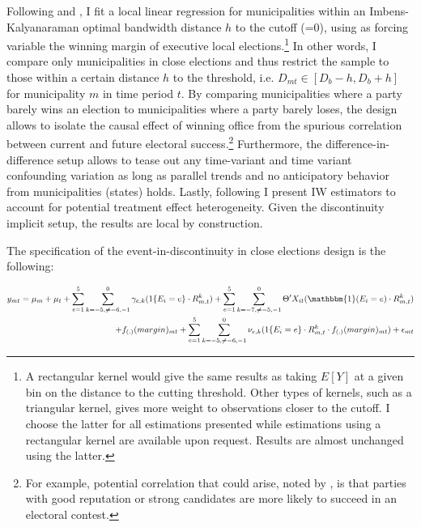 \documentclass[12pt]{amsart}
\numberwithin{equation}{section}
\theoremstyle{definition}
\theoremstyle{definition}
\theoremstyle{definition}
\begin{document}
Following \citet{grembi_2016} and \citet{gelman_imbens2014}, I fit a local linear regression for municipalities within an Imbens-Kalyanaraman optimal bandwidth distance $h$ to the cutoff (=0), using as forcing variable the winning margin of executive local elections.\footnote{A rectangular kernel would give the same results as taking $E[Y]$ at a given bin on the distance to the cutting threshold. Other types of kernels, such as a triangular kernel, gives more weight to observations closer to the cutoff. I choose the latter for all estimations presented while estimations using a rectangular kernel are available upon request. Results are almost unchanged using the latter.} In other words, I compare only municipalities in close elections and thus restrict the sample to those within a certain distance $h$ to the threshold, i.e. $D_{mt} \in [D_b-h, D_b+h]$ for municipality $m$ in time period $t$. By comparing municipalities where a party barely wins an election to municipalities where a party barely loses, the design allows to isolate the causal effect of winning office from the spurious correlation between current and future electoral success.\footnote{For example, potential correlation that could arise, noted by \citet{klasnja_titiunik_2017}, is that parties with good reputation or strong candidates are more likely to succeed in an electoral contest.} Furthermore, the difference-in-difference setup allows to tease out any time-variant and time variant confounding variation as long as parallel trends and no anticipatory behavior from municipalities (states) holds. Lastly, following \citet{abraham_sun_2020} I present IW estimators to account for potential treatment effect heterogeneity. Given the discontinuity implicit setup, the results are local by construction. 

The specification of the event-in-discontinuity in close elections design is the following:

\begin{equation}
\begin{split}
y_{mt}=\mu_m + \mu_t + \sum^5_{e=1} \sum^0_{k=-5, \neq {-6,-1}} \gamma_{e,k}(1\{E_i=e\} \cdot R^k_{m,t}) + \sum^5_{e=1} \sum^0_{k=-7, \neq {-5,-1}}  \Theta'X_{it} (\mathbbm{1}(E_i=e)\cdot R^k_{m,t})  \\
+ f_{(.)}(margin)_{mt} + \sum^5_{e=1} \sum^0_{k=-5, \neq {-6,-1}} \nu_{e,k}(1\{E_i=e\} \cdot R^k_{m,t} \cdot  f_{(.)}(margin)_{mt} )+ \epsilon_{mt}
\end{split}
\end{equation}   
\end{document}
